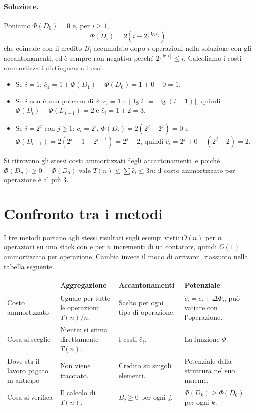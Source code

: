 \paragraph{Soluzione.}
Poniamo $\Phi(D_0) = 0$ e, per $i \ge 1$,
\[
\Phi(D_i) = 2\left(i - 2^{\lfloor \lg i \rfloor}\right)
\]
che coincide con il credito $B_i$ accumulato dopo $i$ operazioni nella soluzione con gli accantonamenti, ed è sempre non negativa perché $2^{\lfloor \lg i \rfloor} \le i$. Calcoliamo i costi ammortizzati distinguendo i casi:
\begin{itemize}
    \item Se $i = 1$: $\hat{c}_1 = 1 + \Phi(D_1) - \Phi(D_0) = 1 + 0 - 0 = 1$.
    \item Se $i$ non è una potenza di $2$: $c_i = 1$ e $\lfloor \lg i \rfloor = \lfloor \lg (i-1) \rfloor$, quindi $\Phi(D_i) - \Phi(D_{i-1}) = 2$ e $\hat{c}_i = 1 + 2 = 3$.
    \item Se $i = 2^j$ con $j \ge 1$: $c_i = 2^j$, $\Phi(D_i) = 2(2^j - 2^j) = 0$ e $\Phi(D_{i-1}) = 2\left(2^j - 1 - 2^{j-1}\right) = 2^j - 2$, quindi $\hat{c}_i = 2^j + 0 - (2^j - 2) = 2$.
\end{itemize}
Si ritrovano gli stessi costi ammortizzati degli accantonamenti, e poiché $\Phi(D_n) \ge 0 = \Phi(D_0)$ vale $T(n) \le \sum \hat{c}_i \le 3n$: il costo ammortizzato per operazione è al più $3$.

\section{Confronto tra i metodi}\label{sec:confronto}
I tre metodi portano agli stessi risultati sugli esempi visti: $O(n)$ per $n$ operazioni su uno stack con \MultiPop{} e per $n$ incrementi di un contatore, quindi $O(1)$ ammortizzato per operazione. Cambia invece il modo di arrivarci, riassunto nella tabella seguente.

\begin{center}
\small
\begin{tabular}{p{2.6cm}p{3.5cm}p{3.5cm}p{3.5cm}}
\toprule
 & \textbf{Aggregazione} & \textbf{Accantonamenti} & \textbf{Potenziale} \\
\midrule
Costo ammortizzato & Uguale per tutte le operazioni: $T(n)/n$. & Scelto per ogni tipo di operazione. & $\hat{c}_i = c_i + \Delta\Phi_i$, può variare con l'operazione. \\[2mm]
Cosa si sceglie & Niente: si stima direttamente $T(n)$. & I costi $\hat{c}_i$. & La funzione $\Phi$. \\[2mm]
Dove sta il lavoro pagato in anticipo & Non viene tracciato. & Credito su singoli elementi. & Potenziale della struttura nel suo insieme. \\[2mm]
Cosa si verifica & Il calcolo di $T(n)$. & $B_j \ge 0$ per ogni $j$. & $\Phi(D_k) \ge \Phi(D_0)$ per ogni $k$. \\
\bottomrule
\end{tabular}
\end{center}

